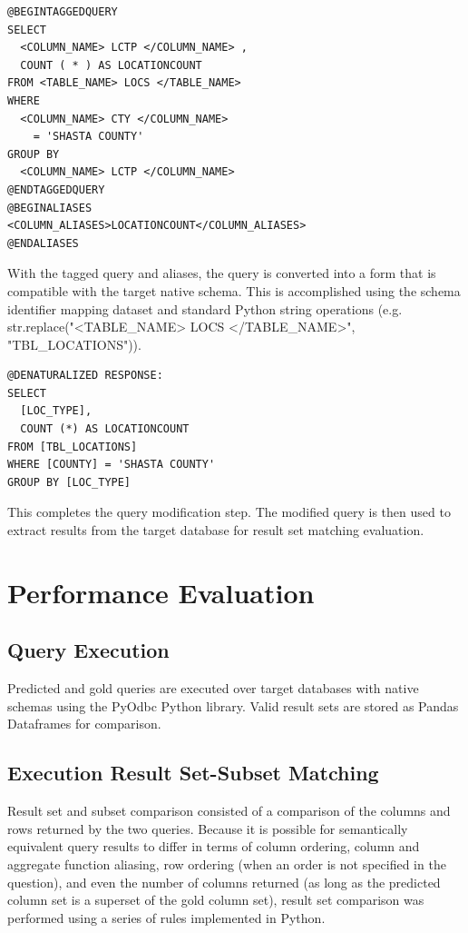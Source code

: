 \begin{verbatim}
@BEGINTAGGEDQUERY
SELECT 
  <COLUMN_NAME> LCTP </COLUMN_NAME> , 
  COUNT ( * ) AS LOCATIONCOUNT 
FROM <TABLE_NAME> LOCS </TABLE_NAME> 
WHERE 
  <COLUMN_NAME> CTY </COLUMN_NAME> 
    = 'SHASTA COUNTY' 
GROUP BY 
  <COLUMN_NAME> LCTP </COLUMN_NAME>
@ENDTAGGEDQUERY
@BEGINALIASES
<COLUMN_ALIASES>LOCATIONCOUNT</COLUMN_ALIASES>
@ENDALIASES  
\end{verbatim}

With the tagged query and aliases, the query is converted into a form that is compatible with the target native schema. This is accomplished using the schema identifier mapping dataset and standard Python string operations (e.g. str.replace("<TABLE\_NAME> LOCS </TABLE\_NAME>", "TBL\_LOCATIONS")).

\begin{verbatim}
@DENATURALIZED RESPONSE:
SELECT 
  [LOC_TYPE], 
  COUNT (*) AS LOCATIONCOUNT 
FROM [TBL_LOCATIONS] 
WHERE [COUNTY] = 'SHASTA COUNTY' 
GROUP BY [LOC_TYPE]   
\end{verbatim}

This completes the query modification step.
The modified query is then used to extract results from the target database for result set matching evaluation.




\section{Performance Evaluation}


\subsection{Query Execution}

Predicted and gold queries are executed over target databases with native schemas using the PyOdbc Python library.
Valid result sets are stored as Pandas Dataframes for comparison.

\subsection{Execution Result Set-Subset Matching}
\label{section:resultsetmatching}

Result set and subset comparison consisted of a comparison of the columns and rows returned by the two queries. Because it is possible for semantically equivalent query results to differ in terms of column ordering, column and aggregate function aliasing, row ordering (when an order is not specified in the question), and even the number of columns returned (as long as the predicted column set is a superset of the gold column set), result set comparison was performed using a series of rules implemented in Python.

